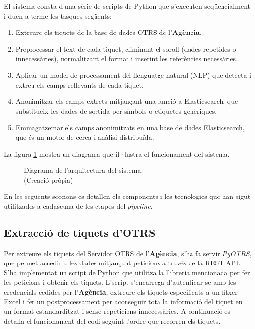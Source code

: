 El sistema consta d'una sèrie de scripts de Python que s'executen seqüencialment i duen a terme les tasques següents:

\begin{enumerate}
     \item Extreure els tiquets de la base de dades OTRS de l'\textbf{Agència}.
     \item Preprocessar el text de cada tiquet, eliminant el soroll (dades repetides o innecessàries), normalitzant el format i inserint les referències necessàries.
     \item Aplicar un model de processament del llenguatge natural (NLP) que detecta i extreu els camps rellevants de cada tiquet.
     \item Anonimitzar els camps extrets mitjançant una funció a Elasticsearch, que substitueix les dades de sortida per símbols o etiquetes genèriques.
     \item Emmagatzemar els camps anonimitzats en una base de dades Elasticsearch, que és un motor de cerca i anàlisi distribuïda.
\end{enumerate}

La figura \ref{fig:pipeline} mostra un diagrama que il·lustra el funcionament del sistema.

\begin{figure}[H]
     \centering
     \vspace{1cm} %
     \setlength{\fboxsep}{5pt} %
     \setlength{\fboxrule}{0pt} %
     \caption[Diagrama de l'arquitectura del sistema]{Diagrama de l'arquitectura del sistema. \\ (Creació pròpia)}
     \label{fig:pipeline}
\end{figure}

En les següents seccions es detallen els components i les tecnologies que han sigut utilitzades a cadascuna de les etapes del \textit{pipeline}.
\subsection{Extracció de tiquets d'OTRS}
Per extreure els tiquets del Servidor OTRS de l'\textbf{Agència}, s'ha fa servir \textit{PyOTRS}, que permet accedir a les dades mitjançant peticions a través de la REST API. S'ha implementat un script de Python que utilitza la llibreria mencionada per fer les peticions i obtenir els tiquets. L'script s'encarrega d'autenticar-se amb les credencials cedides per l'\textbf{Agència}, extreure els tiquets especificats a un fitxer Excel i fer un postprocessament per aconseguir tota la informació del tiquet en un format estandarditzat i sense repeticions innecessàries. A continuació es detalla el funcionament del codi seguint l'ordre que recorren els tiquets.

